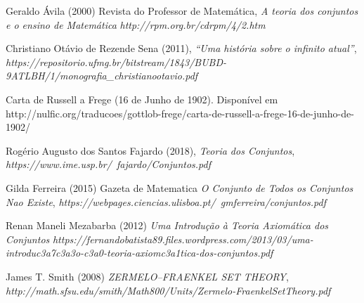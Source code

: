 \documentclass[a4paper,10pt]{article}
\begin{document}
\begin{thebibliography}{topicos1}

 Geraldo Ávila (2000) Revista do Professor de Matemática, \textit{A teoria dos conjuntos e o ensino de Matemática} \textit {http://rpm.org.br/cdrpm/4/2.htm}

 Christiano Otávio de Rezende Sena (2011), \textit{“Uma história sobre o infinito atual”},
\textit{https://repositorio.ufmg.br/bitstream/1843/BUBD-9ATLBH/1/monografia_christianootavio.pdf}

 Carta de Russell a Frege (16 de Junho de 1902). Disponível em http://nulfic.org/traducoes/gottlob-frege/carta-de-russell-a-frege-16-de-junho-de-1902/

 Rogério Augusto dos Santos Fajardo (2018), \textit{Teoria dos Conjuntos}, \textit{https://www.ime.usp.br/~fajardo/Conjuntos.pdf}

 Gilda Ferreira (2015) Gazeta de Matematica \textit{O Conjunto de Todos os Conjuntos Nao Existe}, \textit{https://webpages.ciencias.ulisboa.pt/~gmferreira/conjuntos.pdf}

 Renan Maneli Mezabarba (2012) \textit{Uma Introdução à Teoria Axiomática dos Conjuntos} \textit{https://fernandobatista89.files.wordpress.com/2013/03/uma-introduc3a7c3a3o-c3a0-teoria-axiomc3a1tica-dos-conjuntos.pdf}


 James T. Smith (2008) \textit{ZERMELO–FRAENKEL SET THEORY}, \textit{http://math.sfsu.edu/smith/Math800/Units/Zermelo-FraenkelSetTheory.pdf}


\end{thebibliography}
\end{document}
